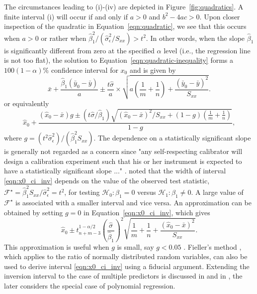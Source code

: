 \documentclass[cmfont,usenames,dvipsnames,leqno]{afit-etd}\usepackage[]{graphicx}\usepackage[]{color}
\newcommand{\boot}{\star} %
\newcommand{\mc}[1]{\ensuremath{\mathcal{#1}}}
\newcommand{\wh}[1]{\ensuremath{\widehat{#1}}}
\begin{document}
The circumstances leading to (i)-(iv) are depicted in Figure~\ref{fig:quadratics}. A finite interval (i) will occur if and only if $a > 0$ and $b^2 - 4ac > 0$. Upon closer inspection of the quadratic in Equation~\eqref{eqn:quadratic}, we see that this occurs when $a > 0$ or rather when $\wh{\beta}_1^2/(\wh{\sigma}_\epsilon^2/S_{xx}) > t^2$. In other words, when the slope $\wh{\beta}_1$ is significantly different from zero at the specified $\alpha$ level (i.e., the regression line is not too flat), the solution to Equation~\eqref{eqn:quadratic-inequality} forms a $100(1-\alpha)\%$ confidence interval for $x_0$ and is given by
\begin{equation}
\label{eqn:x0_ci_inv}
  \bar{x} + \frac{\wh{\beta}_1(\bar{y}_0-\bar{y})}{a} \pm \frac{t\wh{\sigma}}{a} \times \sqrt{a\left(\frac{1}{m}+\frac{1}{n}\right) + \frac{(\bar{y}_0-\bar{y})^2}{S_{xx}}}.
\end{equation}
or equivalently
\begin{equation*}
  \wh{x}_0 + \frac{(\wh{x}_0-\bar{x})g \pm \left(t\wh{\sigma}/\wh{\beta}_1\right)\sqrt{(\wh{x}_0-\bar{x})^2/S_{xx} + (1-g)\left(\frac{1}{m}+\frac{1}{n}\right)}}{1-g},
\end{equation*}
where $g = \left(t^2\wh{\sigma}_\epsilon^2\right)/(\wh{\beta}_1^2 S_{xx})$. The dependence on a statistically significant slope is generally not regarded as a concern since "any self-respecting calibrator will design a calibration experiment such that his or her instrument is expected to have a statistically significant slope ..." \citep[pp. 25]{brown_measurement_1993}. \citet{hoadley_bayesian_1970} noted that the width of interval \eqref{eqn:x0_ci_inv} depends on the value of the observed test statistic, $\mc{F}^\boot = \wh{\beta}_1^2S_{xx}/\wh{\sigma}_\epsilon^2 = t^2$, for testing $\mc{H}_0: \beta_1 = 0$ versus $\mc{H}_1: \beta_1 \ne 0$. A large value of $\mc{F}^\boot$ is associated with a smaller interval and vice versa. An approximation can be obtained by setting $g = 0$ in Equation~\eqref{eqn:x0_ci_inv}, which gives
\begin{equation}
\label{eqn:x0_ci_inv_approx}
  \wh{x}_0 \pm t_{n+m-3}^{1-\alpha/2}\left(\frac{\wh{\sigma}}{\wh{\beta}_1}\right)^2\sqrt{\frac{1}{m}+\frac{1}{n}+\frac{(\wh{x}_0-\bar{x})^2}{S_{xx}}}.
\end{equation}
This approximation is useful when $g$ is small, say $g < 0.05$ \citep{draper_applied_1981}. Fieller's method \citep{fieller_some_1954}, which applies to the ratio of normally distributed random variables, can also be used to derive interval \eqref{eqn:x0_ci_inv} using a fiducial argument. Extending the inversion interval to the case of multiple predictors is discussed in \citet[pg. 229]{draper_applied_1981} and in \citet[chap. 3]{brown_measurement_1993}, the later considers the special case of polynomial regression.
\end{document}
